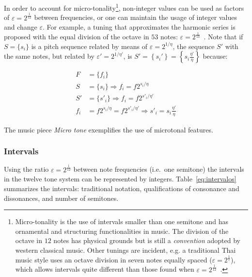 In order to account for micro-tonality\footnote{Micro-tonality is the use of intervals smaller
than one semitone and has ornamental and structuring functionalities in music. The division of the octave in $12$ notes has physical grounds but is still a \emph{convention} adopted by western classical music. Other tunings are incident, e.g. a traditional Thai music style uses an octave division in seven notes equally spaced ($\varepsilon=2^{\frac{1}{7}}$),
which allows intervals quite different than those found when $\varepsilon=2^{\frac{1}{12}}$~\cite{Wisnick}.}, non-integer values can be used as factors of $\varepsilon=2^{\frac{1}{12}}$ between frequencies, or one can maintain the usage of integer values and change $\varepsilon$. For example, a tuning that approximates the harmonic series
is proposed with the equal division of the octave in $53$ notes:
$\varepsilon=2^{\frac{1}{53}}$~\cite{microtonalidade}.
Note that if $S=\{s_i\}$ is a pitch sequence related by means of $\varepsilon=2^{1/\eta}$, the sequence $S'$ with the same notes, but related by $\varepsilon'=2^{1/\eta'}$, is 
$S'=\left\{s_i'\right\}=\left\{
s_i \frac{\eta'}{\eta}\right\}$ because:

\begin{equation}\label{eq:micro}
\begin{split}
    F   & = \{f_i\}\\
    S   & = \{s_i\} \Rightarrow f_i = f 2^{s_i/\eta}\\
    S'  & = \{s'_i\} \Rightarrow f_i = f 2^{s'_i/\eta'}\\
    f_i & =  f 2^{s_i/\eta} = f 2^{s'_i/\eta'} \Rightarrow s'_i = s_i\frac{\eta'}{\eta} 
\end{split}
\end{equation}

The music piece \emph{Micro
tone} exemplifies the use of microtonal features.

\subsubsection{Intervals}\label{subsec:intervalos}
Using the ratio $\varepsilon=2^{\frac{1}{12}}$ between note frequencies (i.e.\ one semitone)
the intervals in the twelve tone system can be represented by integers. Table~\ref{eq:intervalos} summarizes the intervals: traditional notation, qualifications of consonance and
dissonances, and number of semitones.

